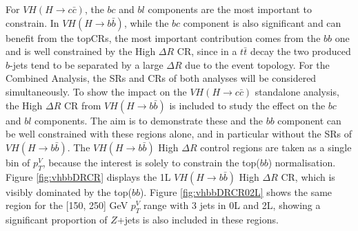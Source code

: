 For $VH(H\rightarrow c\bar{c})$, the $bc$ and $bl$ components are the most important to constrain. In $VH(H\rightarrow b\bar{b})$, while the $bc$ component is also significant and can benefit from the topCRs, the most important contribution comes from the $bb$ one and is well constrained by the High $\Delta R$ CR, since in a $t\bar{t}$ decay the two produced $b$-jets tend to be separated by a large $\Delta R$ due to the event topology. For the Combined Analysis, the SRs and CRs of both analyses will be considered simultaneously. To show the impact on the $VH(H\rightarrow c\bar{c})$ standalone analysis, the High $\Delta R$ CR from  $VH(H\rightarrow b\bar{b})$ is included to study the effect on the $bc$ and $bl$ components. The aim is to demonstrate these and the $bb$ component can be well constrained with these regions alone, and in particular without the SRs of $VH(H\rightarrow b\bar{b})$. The $VH(H\rightarrow b\bar{b})$ High $\Delta R$ control regions are taken as a single bin of $p_T^V$, because the interest is solely to constrain the top($bb$) normalisation. Figure \ref{fig:vhbbDRCR} displays the 1L $VH(H\rightarrow b\bar{b})$ High $\Delta R$ CR, which is visibly dominated by the top($bb$). Figure \ref{fig:vhbbDRCR02L} shows the same region for the [150, 250] GeV $p_T^V$ range with 3 jets in 0L and 2L, showing a significant proportion of $Z$+jets is also included in these regions.  \\


